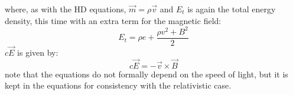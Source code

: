 where, as with the HD equations, $\vec{m}=\rho\vec{v}$ and $E_t$ is again the total energy density, this time with an extra term for the magnetic field:
\begin{equation*}
	E_t = \rho e + \frac{\rho v^2 + B^2}{2}
\end{equation*}
$c\vec{E}$ is given by:
\begin{equation*}
	c\vec{E} = -\vec{v}\times \vec{B}
\end{equation*}
note that the equations do not formally depend on the speed of light, but it is kept in the equations for consistency with the relativistic case.





